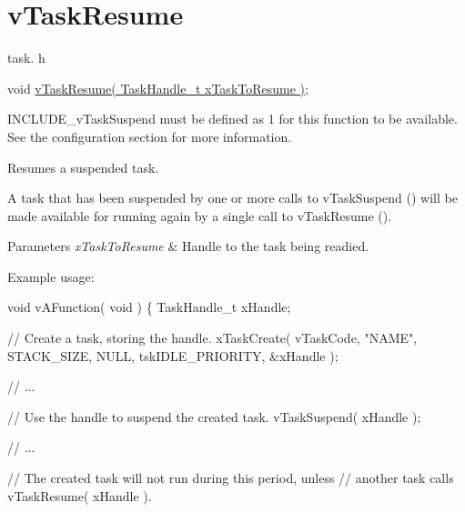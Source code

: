 \hypertarget{group__v_task_resume}{}\section{v\+Task\+Resume}
\label{group__v_task_resume}
task. h 
\begin{DoxyPre}
void \hyperlink{externals_2freertos_2include_2task_8h_a84a1584f29fb7736a1aa72ad5b3e9b44}{vTaskResume( TaskHandle\_t xTaskToResume )};
\end{DoxyPre}


I\+N\+C\+L\+U\+D\+E\+\_\+v\+Task\+Suspend must be defined as 1 for this function to be available. See the configuration section for more information.

Resumes a suspended task.

A task that has been suspended by one or more calls to v\+Task\+Suspend () will be made available for running again by a single call to v\+Task\+Resume ().


\begin{DoxyParams}{Parameters}
{\em x\+Task\+To\+Resume} & Handle to the task being readied.\\
\hline
\end{DoxyParams}
Example usage\+: 
\begin{DoxyPre}
void vAFunction( void )
\{
TaskHandle\_t xHandle;\end{DoxyPre}



\begin{DoxyPre}  // Create a task, storing the handle.
  xTaskCreate( vTaskCode, "NAME", STACK\_SIZE, NULL, tskIDLE\_PRIORITY, \&xHandle );\end{DoxyPre}



\begin{DoxyPre}  // ...\end{DoxyPre}



\begin{DoxyPre}  // Use the handle to suspend the created task.
  vTaskSuspend( xHandle );\end{DoxyPre}



\begin{DoxyPre}  // ...\end{DoxyPre}



\begin{DoxyPre}  // The created task will not run during this period, unless
  // another task calls vTaskResume( xHandle ).\end{DoxyPre}



